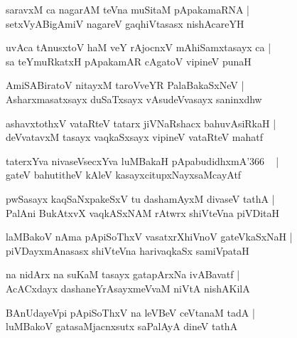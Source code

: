 \documentclass[twoside,12pt,openright]{book}
\newcounter{shloka}[chapter]
\begin{document}
\begin{shloka}%
saravxM ca nagarAM teVna muSitaM pApakamaRNA |\\
setxVyABigAmiV nagareV gaqhiVtasasx nishAcareYH 
\end{shloka}

\begin{shloka}%
uvAca tAnusxtoV haM veY rAjocnxV mAhiSamxtasayx ca |\\
sa teYmuRkatxH pApakamAR cAgatoV vipineV punaH 
\end{shloka}

\begin{shloka}%
AmiSABiratoV nitayxM taroVveYR PalaBakaSxNeV |\\
Asharxmasatxsayx duSaTxsayx vAsudeVvasayx saninxdhw
\end{shloka}

\begin{shloka}%
ashavxtothxV vataRteV tatarx jiVNaRshacx bahuvAsiRkaH |\\
deVvatavxM tasayx vaqkaSxsayx vipineV vataRteV mahatf
\end{shloka}

\begin{shloka}%
taterxYva nivaseVsecxYva luMBakaH pApabudidhxmA\char'366 ~ |\\
gateV bahutitheV kAleV kasayxcitupxNayxsaMcayAtf 
\end{shloka}

\begin{shloka}%
pwSasayx kaqSaNxpakeSxV tu dashamAyxM divaseV tathA |\\
PalAni BukAtxvX vaqkASxNAM rAtwrx shiVteVna piVDitaH
\end{shloka}

\begin{shloka}%
laMBakoV nAma pApiSoThxV vasatxrXhiVnoV gateVkaSxNaH |\\
piVDayxmAnasasx shiVteVna harivaqkaSx samiVpataH 
\end{shloka}

\begin{shloka}%
na nidArx na suKaM tasayx gatapArxNa ivABavatf |\\
AcACxdayx dashaneYrAsayxmeVvaM niVtA nishAKilA
\end{shloka}

\begin{shloka}%
BAnUdayeVpi pApiSoThxV na leVBeV ceVtanaM tadA |\\
luMBakoV gatasaMjacnxsutx saPalAyA dineV tathA 
\end{shloka}
\end{document}
